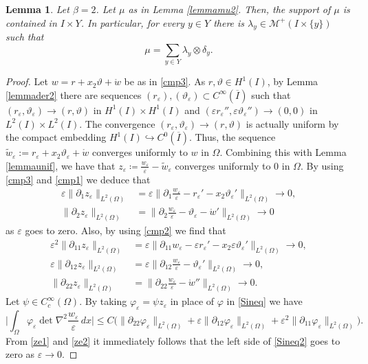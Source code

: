 \documentclass[a4, 11pt, reqno, final]{amsart}
\newcommand{\calM}{\mathcal{M}}
\newcommand\embed{\hookrightarrow} %
\newcommand\e{\varepsilon}
\theoremstyle{plain}%
\newtheorem{lemma}[theorem]{Lemma}
\begin{document}
	\begin{lemma}\label{lemmawsq}
		Let $\beta =2$.
		Let $\mu$ as in Lemma \ref{lemmamu2}. Then, the support of $\mu$ is contained in $I\times Y$.
		In particular,
		for  every $y\in Y$ there is $\lambda_y \in \calM^+(I\times \{y\})$ such that
		$$
		\mu = \sum_{y\in Y} \lambda_y\otimes \delta_y.
		$$
	\end{lemma}
	\begin{proof}
		Let $w=r+x_2\vartheta+\mathring{w}$ be as in \eqref{cmp3}.
		As $r,\vartheta \in H^1(I)$, by Lemma \ref{lemmader2} there are  sequences $(r_\e), (\vartheta_\e) \subset C^\infty(\overline{I})$ such that $(r_\e, \vartheta_\e) \to (r, \vartheta)$ in $H^1(I)\times H^1(I)$  and $(\e r_\e'',\e \vartheta_\e'')\to (0,0)$ in $L^2(I)\times L^2(I)$.  The convergence $(r_\e, \vartheta_\e) \to (r, \vartheta)$ is actually uniform by the compact embedding $H^1(I) \embed C^0(\overline{I})$. Thus, the sequence $\tilde w_\e:=r_\e + x_2 \vartheta_\e+\mathring{w}$ converges uniformly to $w$ in $\Omega$.
		Combining this with Lemma \ref{lemmaunif}, we have that
		$z_\e\coloneqq   \frac{w_\e}{\e} - \tilde w_\e$ converges uniformly to $0$ in $\Omega$.
		By using \eqref{cmp3} and \eqref{cmp1} we deduce that
		\begin{equation}\label{ze1}
			\begin{aligned}
				\e\|\partial_1 z_\e\|_{L^2(\Omega)}&=\e\|\partial_1 \frac{w_\e}\e-r_\e'-x_2\vartheta_\e'\|_{L^2(\Omega)}\to 0,\\
				\|\partial_2 z_\e\|_{L^2(\Omega)}&=\|\partial_2 \frac{w_\e}\e-\vartheta_\e-\mathring{w}'\|_{L^2(\Omega)}\to 0
			\end{aligned}
		\end{equation}
		as $\e$ goes to zero. Also, by using \eqref{cmp2} we find that
		\begin{equation}\label{ze2}
			\begin{aligned}
				\e^2\|\partial_{11} z_\e\|_{L^2(\Omega)}&=\e\|\partial_{11} w_\e-\e r_\e'-x_2\e\vartheta_\e'\|_{L^2(\Omega)}\to 0,\\
				\e\|\partial_{12} z_\e\|_{L^2(\Omega)}&=\e\|\partial_{12} \frac{w_\e}\e-\vartheta_\e'\|_{L^2(\Omega)}\to 0,\\
				\|\partial_{22} z_\e\|_{L^2(\Omega)}&=\|\partial_{22} \frac{w_\e}\e-\mathring{w}''\|_{L^2(\Omega)}\to 0.
			\end{aligned}
		\end{equation}
		Let $\psi \in C_c^\infty(\Omega)$. By taking
		$\varphi_\e = \psi z_\e$ in place of $\varphi$ in \eqref{Sineq} we have
		\begin{equation}\label{Sineq2}
			\Big|\int_\Omega\varphi_\e \det \nabla^2\frac{w_\e}{\e} \,dx\Big|\le C\big(\|\partial_{22}\varphi _\e\|_{L^2(\Omega)}+\e\|\partial_{12}\varphi_\e\|_{L^2(\Omega)}+\e^2\|\partial_{11}\varphi_\e\|_{L^2(\Omega)}\big).
		\end{equation}
		From \eqref{ze1} and \eqref{ze2} it immediately follows that the left side of \eqref{Sineq2} goes to zero as $\e\to 0$.


\end{proof}
\end{document}
